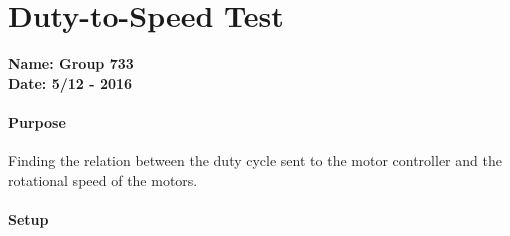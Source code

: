 \chapter{Duty-to-Speed Test}\label{app:duty} 
\textbf{Name: Group 733}\\
\textbf{Date: 5/12 - 2016}

\subsubsection{Purpose}
Finding the relation between the duty cycle sent to the motor controller and the rotational speed of the motors.

\subsubsection{Setup}

